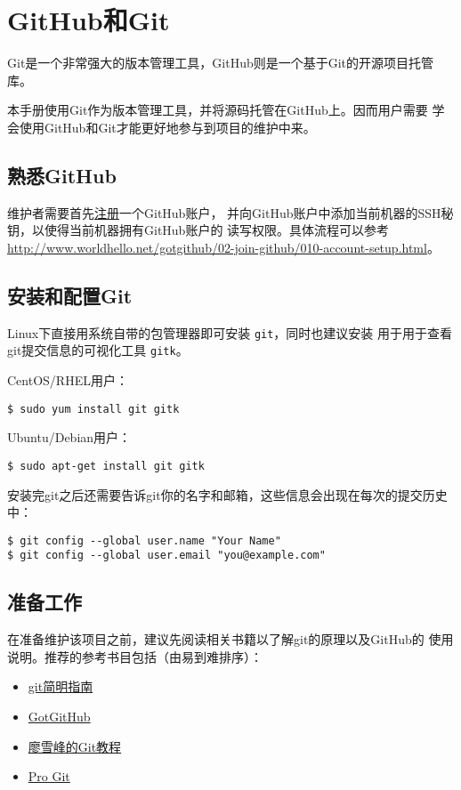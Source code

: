 \section{GitHub和Git}
Git是一个非常强大的版本管理工具，GitHub则是一个基于Git的开源项目托管库。

本手册使用Git作为版本管理工具，并将源码托管在GitHub上。因而用户需要
学会使用GitHub和Git才能更好地参与到项目的维护中来。

\subsection{熟悉GitHub}
维护者需要首先\href{https://github.com/join}{注册}一个GitHub账户，
并向GitHub账户中添加当前机器的SSH秘钥，以使得当前机器拥有GitHub账户的
读写权限。具体流程可以参考
\url{http://www.worldhello.net/gotgithub/02-join-github/010-account-setup.html}。

\subsection{安装和配置Git}
Linux下直接用系统自带的包管理器即可安装 \texttt{git}，同时也建议安装
用于用于查看git提交信息的可视化工具 \texttt{gitk}。

CentOS/RHEL用户：
\begin{verbatim}
$ sudo yum install git gitk
\end{verbatim}

Ubuntu/Debian用户：
\begin{verbatim}
$ sudo apt-get install git gitk
\end{verbatim}

安装完git之后还需要告诉git你的名字和邮箱，这些信息会出现在每次的提交历史中：
\begin{verbatim}
$ git config --global user.name "Your Name"
$ git config --global user.email "you@example.com"
\end{verbatim}

\subsection{准备工作}
在准备维护该项目之前，建议先阅读相关书籍以了解git的原理以及GitHub的
使用说明。推荐的参考书目包括（由易到难排序）：
\begin{itemize}
\item \href{http://rogerdudler.github.io/git-guide/index.zh.html}{git简明指南}
\item \href{http://www.worldhello.net/gotgithub/index.html}{GotGitHub}
\item \href{http://www.liaoxuefeng.com/wiki/0013739516305929606dd18361248578c67b8067c8c017b000}{廖雪峰的Git教程}
\item \href{https://git-scm.com/book/zh/v2}{Pro Git}
\end{itemize}

